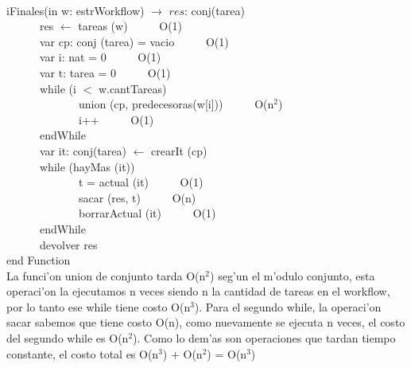 \documentclass[a4paper,10pt]{article}
\begin{document}
\begin{algoritmo}
\caption{}\\
  iFinales(in w: estrWorkflow) $\rightarrow$ $res$: conj(tarea)\\
    \indent \ \ \ \ \ \  res $\gets$ tareas (w) \ \ \ \ \ O(1) \\
    \indent \ \ \ \ \ \  var cp: conj (tarea) = vacio \ \ \ \ \ O(1) \\
    \indent \ \ \ \ \ \  var i: nat = 0 \ \ \ \ \ O(1) \\ 
    \indent \ \ \ \ \ \  var t: tarea = 0 \ \ \ \ \ O(1)  \\   
    \indent \ \ \ \ \ \  while (i $<$ w.cantTareas) \\
    \indent \ \ \ \ \ \ \ \ \ \ \ \ \ union (cp, predecesoras(w[i])) \ \ \ \ \ O(n$^{2}$)  \\   
    \indent \ \ \ \ \ \ \ \ \ \ \ \ \ i++ \ \ \ \ \ O(1) \\
    \indent \ \ \ \ \ \  endWhile \\
    \indent \ \ \ \ \ \  var it: conj(tarea) $\gets$ crearIt (cp) \\
    \indent \ \ \ \ \ \  while (hayMas (it)) \\
    \indent \ \ \ \ \ \ \ \ \ \ \ \ \ t = actual (it) \ \ \ \ \ O(1)\\
    \indent \ \ \ \ \ \ \ \ \ \ \ \ \ sacar (res, t) \ \ \ \ \ O(n) \\
    \indent \ \ \ \ \ \ \ \ \ \ \ \ \ borrarActual (it) \ \ \ \ \ O(1) \\
    \indent \ \ \ \ \ \  endWhile \\
    \indent \ \ \ \ \ \  devolver res    \\
   end Function \\
   
   La funci'on union de conjunto tarda O(n$^{2}$) seg'un el m'odulo conjunto, esta operaci'on la ejecutamos n veces siendo n la cantidad de tareas en el workflow, por lo tanto ese while tiene costo O(n$^{3}$). Para el segundo while, la operaci'on sacar sabemos que tiene costo O(n), como nuevamente se ejecuta n veces, el costo del segundo while es O(n$^{2}$). Como lo dem'as son operaciones que tardan tiempo constante, el costo total es O(n$^{3}$) + O(n$^{2}$) = O(n$^{3}$) 
   
\end{algoritmo}
\end{document}
